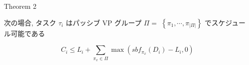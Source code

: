 \begin{frame}[label=theorem2]{Theorem 2}
    \begin{theorem}[]
        次の場合, タスク $\tau_{i}$ はパッシブ VP グループ $\Pi=$  $\left\{\pi_{1}, \cdots, \pi_{|\Pi|}\right\}$ でスケジュール可能である

        \begin{equation*}
            C_{i} \leq L_{i}+\sum_{\pi_{x} \in \Pi} \max \left(s b f_{\pi_{x}}\left(D_{i}\right)-L_{i}, 0\right)
        \end{equation*}
    \end{theorem}
\end{frame}
